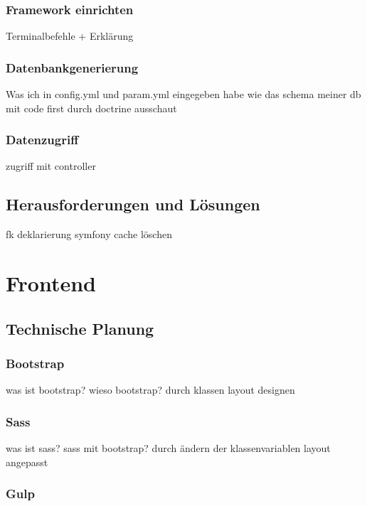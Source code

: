     \subsubsection{Framework einrichten}

Terminalbefehle + Erklärung

    \subsubsection{Datenbankgenerierung}

Was ich in config.yml und param.yml eingegeben habe
wie das schema meiner db mit code  first durch doctrine ausschaut

    \subsubsection{Datenzugriff}

zugriff mit controller

  \subsection{Herausforderungen und Lösungen}

fk deklarierung
symfony cache löschen

\section{Frontend}

  \subsection{Technische Planung}

    \subsubsection{Bootstrap}

was ist bootstrap? wieso bootstrap? durch klassen layout designen

    \subsubsection{Sass}

was ist sass? sass mit bootstrap? 
durch ändern der klassenvariablen layout angepasst

    \subsubsection{Gulp}

